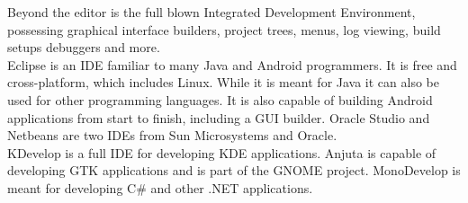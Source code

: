 Beyond the editor is the full blown Integrated Development Environment, possessing graphical interface builders, project trees, menus, log viewing, build setups debuggers and more.\\

Eclipse is an IDE familiar to many Java and Android programmers.  It is free and cross-platform, which includes Linux.  While it is meant for Java it can also be used for other programming languages.  It is also capable of building Android applications from start to finish, including a GUI builder.  Oracle Studio and Netbeans are two IDEs from Sun Microsystems and Oracle.\\

KDevelop is a full IDE for developing KDE applications.  Anjuta is capable of developing GTK applications and is part of the GNOME project.  MonoDevelop is meant for developing C\# and other .NET applications.  
